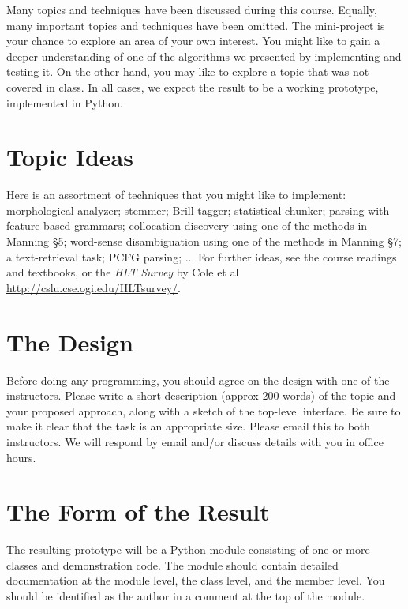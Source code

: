 \documentclass{cis530}
\begin{document}
\maketitle

Many topics and techniques have been discussed during this course.
Equally, many important topics and techniques have been omitted.
The mini-project is your chance to explore an area of your own interest.
You might like to gain a deeper understanding of one of the algorithms we
presented by implementing and testing it.  On the other hand, you may
like to explore a topic that was not covered in class.  In all cases,
we expect the result to be a working prototype, implemented in Python.

\section{Topic Ideas}

Here is an assortment of techniques that you might like to implement:
morphological analyzer; stemmer; Brill tagger; statistical chunker;
parsing with feature-based grammars; collocation
discovery using one of the methods in Manning \S5; word-sense
disambiguation using one of the methods in Manning \S7;
a text-retrieval task; PCFG parsing; ...
For further ideas, see the course readings and textbooks, or
the {\it HLT Survey} by Cole et al \url{http://cslu.cse.ogi.edu/HLTsurvey/}.

\section{The Design}

Before doing any programming, you should agree on the design with one
of the instructors.
Please write a short description (approx 200 words)
of the topic and your proposed approach, along with
a sketch of the top-level interface.  Be sure to make
it clear that the task is an appropriate size.
Please email this
to both instructors.  We will respond by email and/or
discuss details with you in office hours.

\section{The Form of the Result}

The resulting prototype will be a Python module consisting of one or
more classes and demonstration code.  The module should contain
detailed documentation at the module level, the class level, and the
member level.  You should be identified as the author in a comment
at the top of the module.
\end{document}
